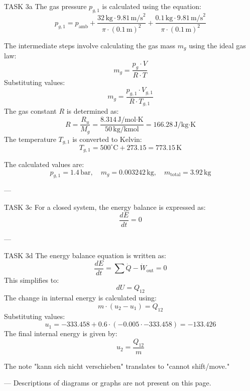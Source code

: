 TASK 3a  
The gas pressure \( p_{g,1} \) is calculated using the equation:  
\[
p_{g,1} = p_{\text{amb}} + \frac{32 \, \text{kg} \cdot 9.81 \, \text{m/s}^2}{\pi \cdot (0.1 \, \text{m})^2} + \frac{0.1 \, \text{kg} \cdot 9.81 \, \text{m/s}^2}{\pi \cdot (0.1 \, \text{m})^2}
\]  

The intermediate steps involve calculating the gas mass \( m_g \) using the ideal gas law:  
\[
m_g = \frac{p_g \cdot V}{R \cdot T}
\]  
Substituting values:  
\[
m_g = \frac{p_{g,1} \cdot V_{g,1}}{R \cdot T_{g,1}}
\]  
The gas constant \( R \) is determined as:  
\[
R = \frac{R_u}{M_g} = \frac{8.314 \, \text{J/mol·K}}{50 \, \text{kg/kmol}} = 166.28 \, \text{J/kg·K}
\]  
The temperature \( T_{g,1} \) is converted to Kelvin:  
\[
T_{g,1} = 500^\circ\text{C} + 273.15 = 773.15 \, \text{K}
\]  

The calculated values are:  
\[
p_{g,1} = 1.4 \, \text{bar}, \quad m_g = 0.003242 \, \text{kg}, \quad m_{\text{total}} = 3.92 \, \text{kg}
\]  

---

TASK 3c  
For a closed system, the energy balance is expressed as:  
\[
\frac{dE}{dt} = 0
\]  

---

TASK 3d  
The energy balance equation is written as:  
\[
\frac{dE}{dt} = \sum \dot{Q} - \dot{W}_{\text{out}} = 0
\]  
This simplifies to:  
\[
dU = Q_{12}
\]  
The change in internal energy is calculated using:  
\[
m \cdot (u_2 - u_1) = Q_{12}
\]  
Substituting values:  
\[
u_1 = -333.458 + 0.6 \cdot (-0.005 \cdot -333.458) = -133.426
\]  
The final internal energy is given by:  
\[
u_2 = \frac{Q_{12}}{m}
\]  

The note "kann sich nicht verschieben" translates to "cannot shift/move."  

---  
Descriptions of diagrams or graphs are not present on this page.